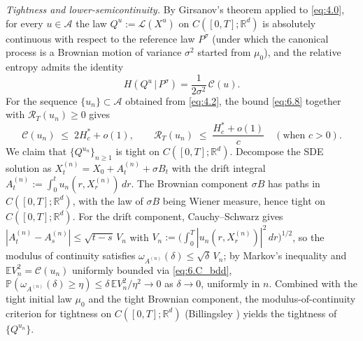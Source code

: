 \documentclass[11pt,leqno]{article}
\theoremstyle{plain}
\theoremstyle{remark}
\theoremstyle{definition}
\numberwithin{equation}{section}
\numberwithin{figure}{section}
\numberwithin{table}{section}
\numberwithin{algorithm}{section}
\newcommand{\EE}{\mathbb{E}}
\newcommand{\RR}{\mathbb{R}}
\begin{document}
\medskip
\emph{Tightness and lower-semicontinuity.}
By Girsanov's theorem applied to \eqref{eq:4.0}, for every $u\in\mathcal{A}$
the law $Q^u:=\mathcal{L}(X^u)$ on $C([0,T];\RR^d)$ is absolutely continuous with respect to the reference law $P^\sigma$
(under which the canonical process is a Brownian motion of variance $\sigma^2$ started from $\mu_0$),
and the relative entropy admits the identity
\begin{equation}\label{eq:6.entropy}
 H(Q^u\,|\,P^\sigma)
 = \frac{1}{2\sigma^2}\,\mathcal{C}(u).
\end{equation}
For the sequence $\{u_n\}\subset\mathcal{A}$ obtained from \eqref{eq:4.2},
the bound \eqref{eq:6.8} together with $\mathcal{R}_T(u_n)\ge 0$ gives
\begin{equation}\label{eq:6.C_bdd}
 \mathcal{C}(u_n)\;\le\;2H^*_c + o(1),\qquad
 \mathcal{R}_T(u_n)\;\le\;\frac{H^*_c+o(1)}{c}\quad(\text{when }c>0).
\end{equation}
We claim that $\{Q^{u_n}\}_{n\ge 1}$ is tight on $C([0,T];\RR^d)$.
Decompose the SDE solution as $X_t^{(n)}=X_0+A_t^{(n)}+\sigma B_t$
with the drift integral $A_t^{(n)}:=\int_0^t u_n(r,X_r^{(n)})\,dr$.
The Brownian component $\sigma B$ has paths in $C([0,T];\RR^d)$, with the law of $\sigma B$ being Wiener measure, hence tight on $C([0,T];\RR^d)$.
For the drift component, Cauchy--Schwarz gives
$|A_t^{(n)}-A_s^{(n)}|\le\sqrt{t-s}\,V_n$ with $V_n:=\bigl(\int_0^T|u_n(r,X_r^{(n)})|^2\,dr\bigr)^{1/2}$,
so the modulus of continuity satisfies $\omega_{A^{(n)}}(\delta)\le\sqrt{\delta}\,V_n$;
by Markov's inequality and $\EE V_n^2=\mathcal{C}(u_n)$ uniformly bounded via \eqref{eq:6.C_bdd},
$\mathbb{P}(\omega_{A^{(n)}}(\delta)\ge\eta)\le\delta\,\EE V_n^2/\eta^2\to 0$ as $\delta\to 0$, uniformly in $n$.
Combined with the tight initial law $\mu_0$ and the tight Brownian component,
the modulus-of-continuity criterion for tightness on $C([0,T];\RR^d)$ (Billingsley \cite[Theorem~7.3]{bil:1999})
yields the tightness of $\{Q^{u_n}\}$.
\end{document}
